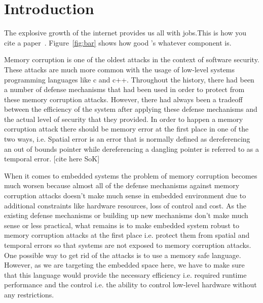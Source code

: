 \section{Introduction}
\label{sec:intro}

The explosive growth of the internet provides us all with jobs.\footnotemark[1]
This is how you cite a paper~\cite{Walls:2011a}. Figure~\ref{fig:bar} shows how
good \sysname's whatever component is. 

Memory corruption is one of the oldest attacks in the context of software security. These attacks are much more common with the usage of low-level systems programming languages like c and c++. Throughout the history, there had been a number of defense mechanisms that had been used in order to protect from these memory corruption attacks. However, there had always been a tradeoff between the efficiency of the system after applying these defense mechanisms and the actual level of security that they provided. In order to happen a memory corruption attack there should be memory error at the first place in one of the two ways, i.e. Spatial error is an error that is normally defined as dereferencing an out of bounds pointer while dereferencing a dangling pointer is referred to as a temporal error. [cite here SoK]

When it comes to embedded systems the problem of memory corruption becomes much worsen because almost all of the defense mechanisms against memory corruption attacks doesn't make much sense in embedded environment due to additional constraints like hardware resources, loss of control and cost. As the existing defense mechanisms or building up new mechanisms don’t make much sense or less practical, what remains is to make embedded system robust to memory corruption attacks at the first place i.e. protect them from spatial and temporal errors so that systems are not exposed to memory corruption attacks. One possible way to get rid of the attacks is to use a memory safe language. However, as we are targeting the embedded space here, we have to make sure that this language would provide the necessary efficiency i.e. required runtime performance and the control i.e. the ability to control low-level hardware without any restrictions. 

